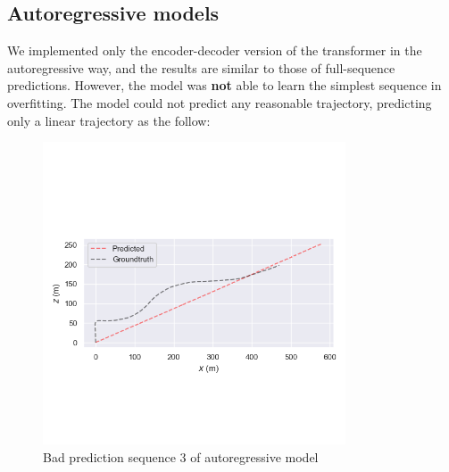 \subsection{Autoregressive models}\label{subsec:autoregressive-model}
We implemented only the encoder-decoder version of the transformer in the autoregressive way, and the results are similar to those of full-sequence predictions.
However, the model was \textbf{not} able to learn the simplest sequence in overfitting.
The model could not predict any reasonable trajectory, predicting only a linear trajectory as the follow:
\begin{figure}[H]
    \centering
    \includegraphics[width=0.8\textwidth]{images/1_4_autoregressive_prediction}
    \caption{Bad prediction sequence 3 of autoregressive model}\label{fig:autoregressive-seq-3}
\end{figure}